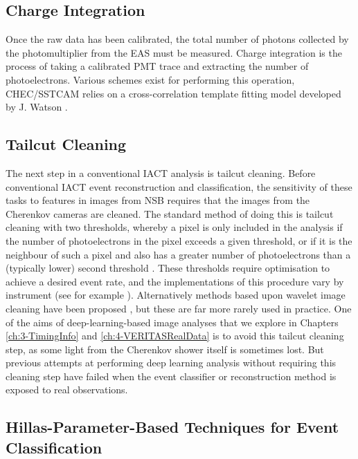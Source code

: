 \subsection{Charge Integration}

Once the raw data has been calibrated, the total number of photons collected by the photomultiplier from the EAS must be measured. Charge integration is the process of taking a calibrated PMT trace and extracting the number of photoelectrons. Various schemes exist for performing this operation, CHEC/SSTCAM relies on a cross-correlation template fitting model developed by J. Watson \cite{jasonthesis}.

\subsection{Tailcut Cleaning}

The next step in a conventional IACT analysis is tailcut cleaning. Before conventional IACT event reconstruction and classification, the sensitivity of these tasks to features in images from NSB requires that the images from the Cherenkov cameras are cleaned. The standard method of doing this is tailcut cleaning with two thresholds, whereby a pixel is only included in the analysis if the number of photoelectrons in the pixel exceeds a given threshold, or if it is the neighbour of such a pixel and also has a greater number of photoelectrons than a (typically lower) second threshold \cite{hegratailcut}. These thresholds require optimisation to achieve a desired event rate, and the implementations of this procedure vary by instrument (see for example \cite{Benbow} \cite{magictailcut} \cite{magictime}). Alternatively methods based upon wavelet image cleaning have been proposed \cite{wavelet}, but these are far more rarely used in practice. One of the aims of deep-learning-based image analyses that we explore in Chapters \ref{ch:3-TimingInfo} and \ref{ch:4-VERITASRealData} is to avoid this tailcut cleaning step, as some light from the Cherenkov shower itself is sometimes lost. But previous attempts at performing deep learning analysis without requiring this cleaning step have failed when the event classifier or reconstruction method is exposed to real observations. 

\subsection{Hillas-Parameter-Based Techniques for Event Classification}

